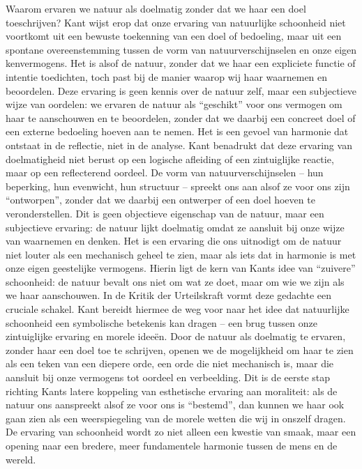 \begin{mdframed}[leftmargin=0pt,rightmargin=0pt,backgroundcolor=blue!6,linecolor=white,innertopmargin=6pt,innerbottommargin=6pt]
\bigskip
Waarom ervaren we natuur als doelmatig zonder dat we haar een doel toeschrijven? Kant wijst erop dat onze ervaring van natuurlijke schoonheid niet voortkomt uit een bewuste toekenning van een doel of bedoeling, maar uit een spontane overeenstemming tussen de vorm van natuurverschijnselen en onze eigen kenvermogens. Het is alsof de natuur, zonder dat we haar een expliciete functie of intentie toedichten, toch past bij de manier waarop wij haar waarnemen en beoordelen. Deze ervaring is geen kennis over de natuur zelf, maar een subjectieve wijze van oordelen: we ervaren de natuur als “geschikt” voor ons vermogen om haar te aanschouwen en te beoordelen, zonder dat we daarbij een concreet doel of een externe bedoeling hoeven aan te nemen. Het is een gevoel van harmonie dat ontstaat in de reflectie, niet in de analyse.
Kant benadrukt dat deze ervaring van doelmatigheid niet berust op een logische afleiding of een zintuiglijke reactie, maar op een reflecterend oordeel. De vorm van natuurverschijnselen – hun beperking, hun evenwicht, hun structuur – spreekt ons aan alsof ze voor ons zijn “ontworpen”, zonder dat we daarbij een ontwerper of een doel hoeven te veronderstellen. Dit is geen objectieve eigenschap van de natuur, maar een subjectieve ervaring: de natuur lijkt doelmatig omdat ze aansluit bij onze wijze van waarnemen en denken. Het is een ervaring die ons uitnodigt om de natuur niet louter als een mechanisch geheel te zien, maar als iets dat in harmonie is met onze eigen geestelijke vermogens. Hierin ligt de kern van Kants idee van “zuivere” schoonheid: de natuur bevalt ons niet om wat ze doet, maar om wie we zijn als we haar aanschouwen.
In de Kritik der Urteilskraft vormt deze gedachte een cruciale schakel. Kant bereidt hiermee de weg voor naar het idee dat natuurlijke schoonheid een symbolische betekenis kan dragen – een brug tussen onze zintuiglijke ervaring en morele ideeën. Door de natuur als doelmatig te ervaren, zonder haar een doel toe te schrijven, openen we de mogelijkheid om haar te zien als een teken van een diepere orde, een orde die niet mechanisch is, maar die aansluit bij onze vermogens tot oordeel en verbeelding. Dit is de eerste stap richting Kants latere koppeling van esthetische ervaring aan moraliteit: als de natuur ons aanspreekt alsof ze voor ons is “bestemd”, dan kunnen we haar ook gaan zien als een weerspiegeling van de morele wetten die wij in onszelf dragen. De ervaring van schoonheid wordt zo niet alleen een kwestie van smaak, maar een opening naar een bredere, meer fundamentele harmonie tussen de mens en de wereld.

\end{mdframed}
